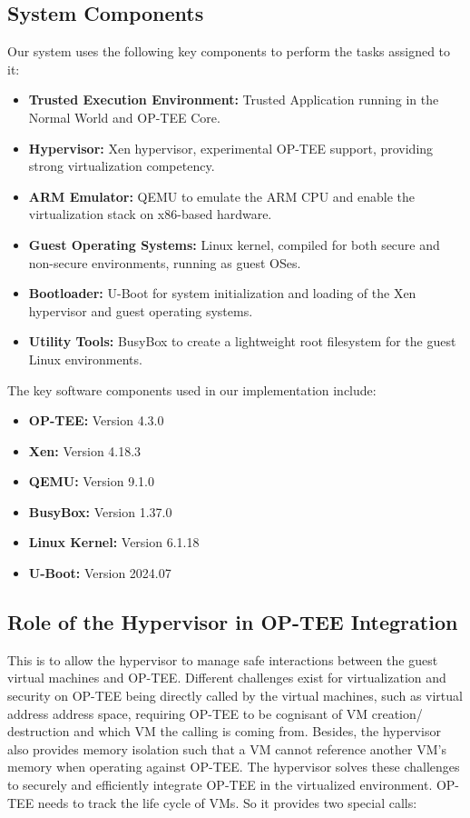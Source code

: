 \documentclass[acmtog]{acmart}
\begin{document}
\subsection{System Components}
Our system uses the following key components to perform the tasks assigned to it: 
\begin{itemize}
  \item \textbf{Trusted Execution Environment:} Trusted Application running in the Normal World and OP-TEE Core.
    \item \textbf{Hypervisor:} Xen hypervisor, experimental OP-TEE support, providing strong virtualization competency.
    \item \textbf{ARM Emulator:} QEMU to emulate the ARM CPU and enable the virtualization stack on x86-based hardware.
    \item \textbf{Guest Operating Systems:} Linux kernel, compiled for both secure and non-secure environments, running as guest OSes.
    \item \textbf{Bootloader:} U-Boot for system initialization and loading of the Xen hypervisor and guest operating systems.
    \item \textbf{Utility Tools:} BusyBox to create a lightweight root filesystem for the guest Linux environments.
\end{itemize}


The key software components used in our implementation include: 

\begin{itemize}
  \item \textbf{OP-TEE:} Version 4.3.0

  \item \textbf{Xen:} Version 4.18.3
  \item \textbf{QEMU:} Version 9.1.0

    \item \textbf{BusyBox:} Version 1.37.0
    \item \textbf{Linux Kernel:} Version 6.1.18

    \item \textbf{U-Boot:} Version 2024.07


\end{itemize}



\subsection{Role of the Hypervisor in OP-TEE Integration}
This is to allow the hypervisor to manage safe interactions between the guest virtual machines and OP-TEE. Different challenges exist for virtualization and security on OP-TEE being directly called by the virtual machines, such as virtual address address space, requiring OP-TEE to be cognisant of VM creation/ destruction and which VM the calling is coming from. Besides, the hypervisor also provides memory isolation such that a VM cannot reference another VM's memory when operating against OP-TEE. The hypervisor solves these challenges to securely and efficiently integrate OP-TEE in the virtualized environment. OP-TEE needs to track the life cycle of VMs. So it provides two special
calls:
\end{document}

